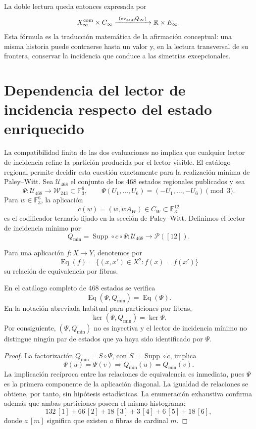 La doble lectura queda entonces expresada por
\[
 X_\infty^{\rm com}\times C_\infty
 \xrightarrow{\ (\operatorname{ev}_{\rm arq},Q_\infty)\ }
 \mathbb R\times E_\infty.
\]
Esta fórmula es la traducción matemática de la afirmación conceptual: una
misma historia puede contraerse hasta un valor y, en la lectura transversal
de su frontera, conservar la incidencia que conduce a las simetrías
excepcionales.


\section{Dependencia del lector de incidencia respecto del estado enriquecido}
\label{p12-83-c17-s4:sec:obstruccion-lector-excepcional-minimo}

La compatibilidad finita de las dos evaluaciones no implica que cualquier
lector de incidencia refine la partición producida por el lector visible. El
catálogo regional permite decidir esta cuestión exactamente para la
realización mínima de Paley--Witt. Sea \(\mathcal U_{468}\) el conjunto de
los 468 estados regionales publicados y sea
\[
 \Psi:\mathcal U_{468}\longrightarrow\mathcal W_{243}\subset\mathbb F_3^6,
 \qquad
 \Psi(U_1,\ldots,U_6)=(-U_1,\ldots,-U_6)\pmod 3.
\]
Para \(w\in\mathbb F_3^6\), la aplicación
\[
 c(w)=(w,wA_W)\in C_W\subset\mathbb F_3^{12}
\]
es el codificador ternario fijado en la sección de Paley--Witt. Definimos
el lector de incidencia mínimo por
\[
 Q_{\min}=\operatorname{Supp}\circ c\circ\Psi:
 \mathcal U_{468}\longrightarrow\mathcal P([12]).
\]

Para una aplicación \(f:X\to Y\), denotemos por
\[
 \operatorname{Eq}(f)=\{(x,x')\in X^2:f(x)=f(x')\}
\]
su relación de equivalencia por fibras.

\begin{theorem}
\label{p12-83-c17-s4:thm:obstruccion-lector-excepcional-minimo}
En el catálogo completo de 468 estados se verifica
\[
 \operatorname{Eq}(\Psi,Q_{\min})=\operatorname{Eq}(\Psi).
\]
En la notación abreviada habitual para particiones por fibras,
\[
 \ker(\Psi,Q_{\min})=\ker\Psi.
\]
Por consiguiente, \((\Psi,Q_{\min})\) no es inyectiva y el lector de
incidencia mínimo no distingue ningún par de estados que ya haya sido
identificado por \(\Psi\).
\end{theorem}

\begin{proof}
La factorización \(Q_{\min}=S\circ\Psi\), con
\(S=\operatorname{Supp}\circ c\), implica
\[
 \Psi(u)=\Psi(v)\Longrightarrow Q_{\min}(u)=Q_{\min}(v).
\]
La implicación recíproca entre las relaciones de equivalencia es inmediata,
pues \(\Psi\) es la primera componente de la aplicación diagonal. La
igualdad de relaciones se obtiene, por tanto, sin hipótesis estadísticas.
La enumeración exhaustiva confirma además que ambas particiones poseen el
mismo histograma:
\[
 132\,[1]+66\,[2]+18\,[3]+3\,[4]+6\,[5]+18\,[6],
\]
donde \(a\,[m]\) significa que existen \(a\) fibras de cardinal \(m\).
\end{proof}

